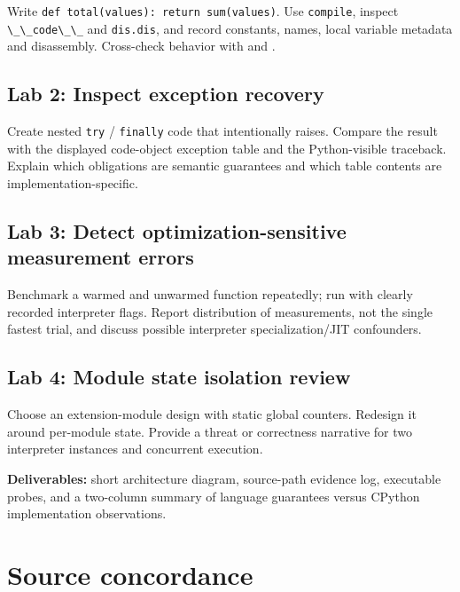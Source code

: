 \documentclass[
  11pt,
]{report}
\newcommand{\passthrough}[1]{#1}
\begin{document}
Write \passthrough{\lstinline!def total(values): return sum(values)!}.
Use \passthrough{\lstinline!compile!}, inspect
\passthrough{\lstinline!\_\_code\_\_!} and
\passthrough{\lstinline!dis.dis!}, and record constants, names, local
variable metadata and disassembly. Cross-check behavior with
 and
.

\section{Lab 2: Inspect exception
recovery}\label{lab-2-inspect-exception-recovery}

Create nested \passthrough{\lstinline!try!} /
\passthrough{\lstinline!finally!} code that intentionally raises.
Compare the result with the displayed code-object exception table and
the Python-visible traceback. Explain which obligations are semantic
guarantees and which table contents are implementation-specific.

\section{Lab 3: Detect optimization-sensitive measurement
errors}\label{lab-3-detect-optimization-sensitive-measurement-errors}

Benchmark a warmed and unwarmed function repeatedly; run with clearly
recorded interpreter flags. Report distribution of measurements, not the
single fastest trial, and discuss possible interpreter
specialization/JIT confounders.

\section{Lab 4: Module state isolation
review}\label{lab-4-module-state-isolation-review}

Choose an extension-module design with static global counters. Redesign
it around per-module state. Provide a threat or correctness narrative
for two interpreter instances and concurrent execution.

\textbf{Deliverables:} short architecture diagram, source-path evidence
log, executable probes, and a two-column summary of language guarantees
versus CPython implementation observations.

\chapter{Source concordance}\label{source-concordance}
\end{document}
